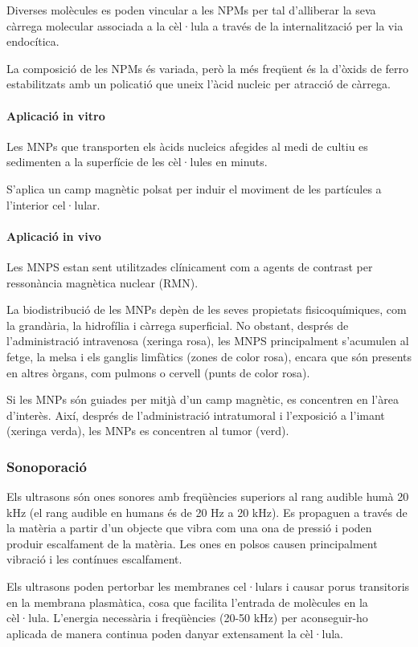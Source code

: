 Diverses molècules es poden vincular a les NPMs per tal d'alliberar la seva càrrega molecular associada a la cèl·lula a través de la internalització per la via endocítica.

La composició de les NPMs és variada, però la més freqüent és la d'òxids de ferro estabilitzats amb un policatió que uneix l'àcid nucleic per atracció de càrrega.

\paragraph{Aplicació in vitro}
Les MNPs que transporten els àcids nucleics afegides al medi de cultiu es sedimenten a la superfície de les cèl·lules en minuts.

S'aplica un camp magnètic polsat per induir el moviment de les partícules a l'interior cel·lular.

\paragraph{Aplicació in vivo}
Les MNPS estan sent utilitzades clínicament com a agents de contrast
per ressonància magnètica nuclear (RMN).

La biodistribució de les MNPs depèn de les seves propietats fisicoquímiques, com la grandària, la hidrofília i càrrega superficial. No obstant, després de l'administració intravenosa (xeringa rosa), les MNPS principalment s'acumulen al fetge, la melsa i els ganglis limfàtics (zones de color rosa), encara que són presents en altres òrgans, com pulmons o cervell (punts de color rosa).

Si les MNPs són guiades per mitjà d'un camp magnètic, es concentren en l'àrea d'interès. Així, després de l'administració intratumoral i l'exposició a l'imant (xeringa verda), les MNPs es concentren al tumor (verd).

\subsubsection{Sonoporació}
\label{sec:sonoporacio}
Els ultrasons són ones sonores amb freqüències superiors al rang audible humà 20 kHz (el rang audible en humans és de 20 Hz a 20 kHz). Es propaguen a través de la matèria a partir d'un objecte que vibra com una ona de pressió i poden produir escalfament de la matèria. Les ones en polsos causen principalment vibració i les contínues escalfament.

Els ultrasons poden pertorbar les membranes cel·lulars i causar porus transitoris en la membrana plasmàtica, cosa que facilita l'entrada de molècules en la cèl·lula. L'energia necessària i freqüències (20-50 kHz) per aconseguir-ho aplicada de manera continua poden danyar extensament la cèl·lula.

